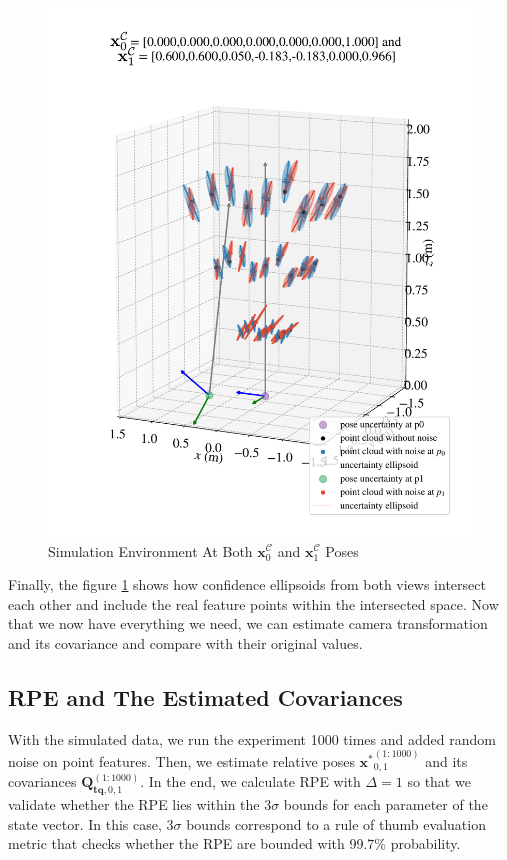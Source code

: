 \documentclass[a4paper]{report}
\numberwithin{figure}{section}
\begin{document}
\begin{figure}[H]
  \centering
  \includegraphics[width=\linewidth,natwidth=640,natheight=640]
  {fig/eva_graphs/sim_at_p0p1_edit.pdf}
  \caption[Simulation Environment At Both Poses]
  {Simulation Environment At Both 
  $\mathbf{x}_0^{\mathcal{C}}$ and $\mathbf{x}_1^{\mathcal{C}}$ Poses}
	\label{fig:sim_at_p0p1}
\end{figure}

Finally, the figure \ref{fig:sim_at_p0p1} shows how confidence ellipsoids 
from both views intersect each other and include the real feature points within 
the intersected space.
Now that we now have everything we need, we can estimate camera transformation 
and its covariance and compare with their original values.

\subsection{RPE and The Estimated Covariances}

With the simulated data, we run the experiment 1000 times and added random noise on point features. Then, we estimate relative poses $\mathbf{x^*}_{0,1}^{(1:1000)}$ and its covariances $\mathbf{Q}_{\mathbf{tq},0,1}^{(1:1000)}$.  In the end, we calculate RPE with $\Delta=1$ so that we validate whether the RPE lies within the $3\sigma$ bounds for each parameter of the state vector. In this case, $3\sigma$ bounds correspond to a rule of thumb evaluation metric that checks whether the RPE are bounded with 99.7\% probability.
\end{document}
